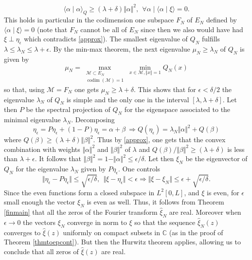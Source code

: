 \documentclass{amsart}
\def\C{{\mathbb C}}
\def\C{{\mathbb C}}
\begin{document}
 $$
 \langle \alpha\mid \alpha\rangle_Q\geq (\lambda+\delta)\Vert \alpha\Vert^2, \ \ \forall  \alpha \mid \langle \alpha\mid \xi\rangle=0.
 $$
 This holds in particular in the codimension one subspace $F_N$ of $E_N$ defined by $\langle \alpha\mid \xi\rangle=0$ (note that $F_N$ cannot be all of $E_N$ since then we also would have had $\xi \perp \eta_\epsilon$ which contradicts \eqref{approx}). The smallest eigenvalue of $Q_N$ fulfills $\lambda\leq \lambda_N\leq \lambda+\epsilon$. By the  min-max theorem, the next eigenvalue $\mu_N\geq \lambda_N$  of $Q_N$ is given by 
$$
\mu_N=\max _{\substack{\mathcal{M} \subset E_N \\ \operatorname{codim}(\mathcal{M})=1}} \min _{x \in \mathcal{M}, \Vert x\Vert=1}Q_N(x)
$$
so that, using $\mathcal{M}=F_N$ one gets $\mu_N\geq \lambda+\delta$. This shows that for $\epsilon<\delta/2$ the eigenvalue $\lambda_N$ of $Q_N$ is simple and the only one in the interval $[\lambda,\lambda+\delta]$. Let then $P$ be the spectral projection of $Q_N$ for the eigenspace associated to the minimal eigenvalue $\lambda_N$. Decomposing 
$$\eta_\epsilon= P\eta_\epsilon+ (1-P)\eta_\epsilon=\alpha+\beta \ \Rightarrow Q(\eta_\epsilon)=\lambda_N \Vert\alpha\Vert^2+Q(\beta)$$ 
where $Q(\beta)\geq (\lambda+\delta)\Vert\beta\Vert^2$. Thus 
 by \eqref{approx}, one gets that the convex combination with weights $\Vert\alpha\Vert^2$ and $\Vert\beta\Vert^2$ of $\lambda$ and $Q(\beta)/\Vert\beta\Vert^2\geq (\lambda+\delta)$ is less than $\lambda+\epsilon$. It follows that $\Vert\beta\Vert^2=1-\Vert\alpha\Vert^2\leq \epsilon/\delta$. Let then $\xi_N$  be the eigenvector of $Q_N$ for the eigenvalue $\lambda_N$ given by $P\eta_\epsilon$. One controls 
 $$
 \Vert\eta_\epsilon-P\eta_\epsilon\Vert\leq \sqrt{\epsilon/\delta}, \  \ \Vert\xi-\eta_\epsilon\Vert<\epsilon\Rightarrow \Vert \xi -\xi_N\Vert \leq \epsilon+\sqrt{\epsilon/\delta}.
 $$
 Since the even functions form a closed subspace in $L^2[0,L]$, and $\xi$ is even, for $\epsilon$ small enough the vector $\xi_N$ is even as well. Thus, it follows from Theorem \ref{finmain} that all the zeros of the Fourier transform $\widehat \xi_N$ are real. Moreover when $\epsilon\to 0$ the vectors $\xi_N$ converge in norm to $\xi$ so that the sequence $\widehat \xi_N(z)$ converges to $\widehat \xi(z)$ uniformly on compact subsets in $\C$ (as in the proof of Theorem \ref{thmtoepcont}). But then the Hurwitz theorem applies, allowing us to conclude that all zeros of $\widehat \xi(z)$ are real.
 \endproof 
 
 
 
\end{document}
